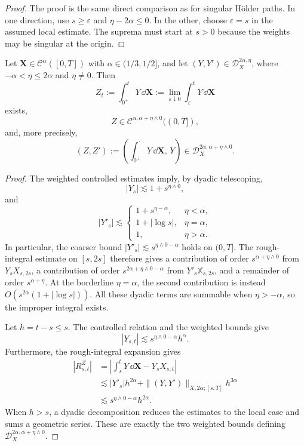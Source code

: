 \begin{proof}
The proof is the same direct comparison as for singular Hölder paths.  In one
direction, use $s\ge\varepsilon$ and $\eta-2\alpha\le0$.  In the other,
choose $\varepsilon=s$ in the assumed local estimate.  The suprema must start
at $s>0$ because the weights may be singular at the origin.
\end{proof}

\begin{thm}
Let $\mathbf X\in\mathscr C^\alpha([0,T])$ with
$\alpha\in(1/3,1/2]$, and let
$(Y,Y')\in\mathscr D_X^{2\alpha,\eta}$, where
$-\alpha<\eta\le2\alpha$ and $\eta\ne0$.  Then
\[
  Z_t:=\int_{0^+}^tY\,\dd\mathbf X
  :=\lim_{\varepsilon\downarrow0}
    \int_\varepsilon^tY\,\dd\mathbf X
\]
exists,
\[
  Z\in\mathcal C^{\alpha,\alpha+\eta\wedge0}((0,T]),
\]
and, more precisely,
\[
  (Z,Z'):=\left(\int_{0^+}^\cdot Y\,\dd\mathbf X,\,Y\right)
  \in\mathscr D_X^{2\alpha,\alpha+\eta\wedge0}.
\]
\end{thm}

\begin{proof}
The weighted controlled estimates imply, by dyadic telescoping,
\[
 |Y_s|\lesssim1+s^{\eta\wedge0},
\]
and
\[
 |Y'_s|\lesssim
 \begin{cases}
   1+s^{\eta-\alpha},&\eta<\alpha,\\
   1+|\log s|,&\eta=\alpha,\\
   1,&\eta>\alpha.
 \end{cases}
\]
In particular, the coarser bound
$|Y'_s|\lesssim s^{\eta\wedge0-\alpha}$ holds on $(0,T]$.  The
rough-integral estimate on $[s,2s]$ therefore gives a contribution of order
$s^{\alpha+\eta\wedge0}$ from $Y_sX_{s,2s}$, a contribution of order
$s^{2\alpha+\eta\wedge0-\alpha}$ from $Y'_s\mathbb X_{s,2s}$, and a
remainder of order $s^{\alpha+\eta}$.  At the borderline $\eta=\alpha$, the
second contribution is instead $O(s^{2\alpha}(1+|\log s|))$.  All these
dyadic terms are summable when $\eta>-\alpha$, so the improper integral
exists.

Let $h=t-s\le s$.  The controlled relation and the weighted bounds give
\[
 |Y_{s,t}|\lesssim s^{\eta\wedge0-\alpha}h^\alpha.
\]
Furthermore, the rough-integral expansion gives
\begin{align*}
|R^Z_{s,t}|
&=\left|\int_s^tY\,\dd\mathbf X-Y_sX_{s,t}\right|\\
&\lesssim |Y'_s|h^{2\alpha}
 +\|(Y,Y')\|_{X,2\alpha;[s,T]}h^{3\alpha}\\
&\lesssim s^{\eta\wedge0-\alpha}h^{2\alpha}.
\end{align*}
When $h>s$, a dyadic decomposition reduces the estimates to the local case and
sums a geometric series.  These are exactly the two weighted bounds defining
$\mathscr D_X^{2\alpha,\alpha+\eta\wedge0}$.
\end{proof}


